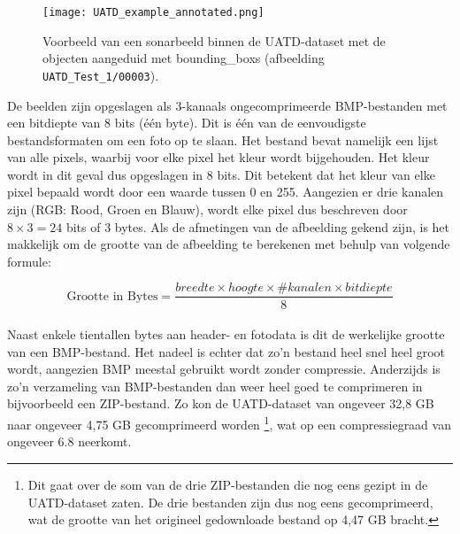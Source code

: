 \begin{figure}[H]
    \centering
    \texttt{[image: UATD\_example\_annotated.png]}
    \caption[UATD afbeelding met bounding boxes.]{\label{fig:uatd_image}Voorbeeld van een sonarbeeld binnen de UATD-dataset met de objecten aangeduid met \glspl{bounding_box} (afbeelding \texttt{UATD\_Test\_1/00003}). \autocite{Xie_2022}}
\end{figure}

De beelden zijn opgeslagen als 3-kanaals ongecomprimeerde BMP-bestanden met een bitdiepte van 8 bits (één byte). Dit is één van de eenvoudigste bestandsformaten om een foto op te slaan. Het bestand bevat namelijk een lijst van alle pixels, waarbij voor elke pixel het kleur wordt bijgehouden. Het kleur wordt in dit geval dus opgeslagen in 8 bits. Dit betekent dat het kleur van elke pixel bepaald wordt door een waarde tussen 0 en 255. Aangezien er drie kanalen zijn (RGB: Rood, Groen en Blauw), wordt elke pixel dus beschreven door $8 \times 3 = 24$ bits of 3 bytes. Als de afmetingen van de afbeelding gekend zijn, is het makkelijk om de grootte van de afbeelding te berekenen met behulp van volgende formule:

$$
\text{Grootte in Bytes} = \frac{breedte \times hoogte \times \#kanalen \times bitdiepte}{8}
$$ \\

Naast enkele tientallen bytes aan header- en fotodata is dit de werkelijke grootte van een BMP-bestand. Het nadeel is echter dat zo'n bestand heel snel heel groot wordt, aangezien BMP meestal gebruikt wordt zonder compressie. Anderzijds is zo'n verzameling van BMP-bestanden dan weer heel goed te comprimeren in bijvoorbeeld een ZIP-bestand. Zo kon de UATD-dataset van ongeveer 32,8 GB naar ongeveer 4,75 GB gecomprimeerd worden \footnote{Dit gaat over de som van de drie ZIP-bestanden die nog eens gezipt in de UATD-dataset zaten. De drie bestanden zijn dus nog eens gecomprimeerd, wat de grootte van het origineel gedownloade bestand op 4,47 GB bracht.}, wat op een compressiegraad van ongeveer 6.8 neerkomt. \autocite{Bourke_1998}

